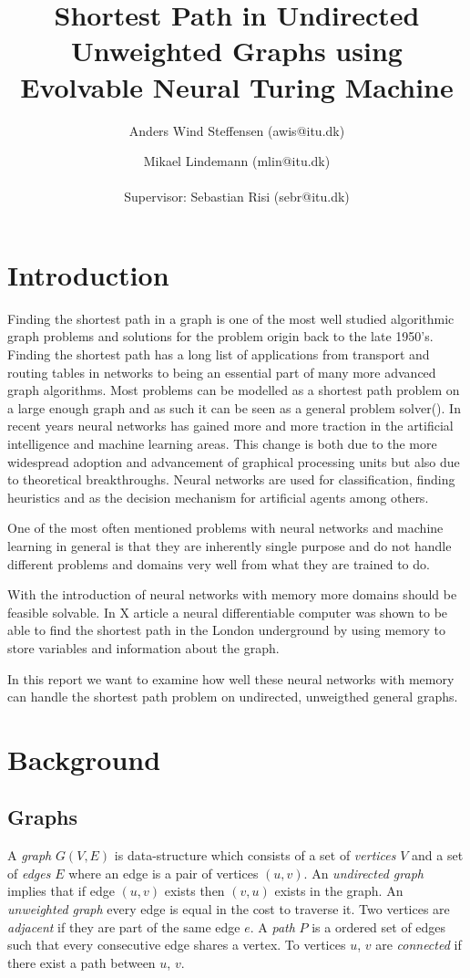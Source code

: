 \documentclass{article}
\author{Anders Wind Steffensen (awis@itu.dk)\and Mikael Lindemann (mlin@itu.dk)\\\\Supervisor: Sebastian Risi (sebr@itu.dk)}
\title{Shortest Path in Undirected Unweighted Graphs using Evolvable Neural Turing Machine}
\begin{document}
\maketitle
\tableofcontents
\newpage
\section{Introduction}
Finding the shortest path in a graph is one of the most well studied algorithmic graph problems and solutions for the problem origin back to the late 1950's. Finding the shortest path has a long list of applications from transport and routing tables in networks to being an essential part of many more advanced graph algorithms. Most problems can be modelled as a shortest path problem on a large enough graph and as such it can be seen as a general problem solver(). In recent years neural networks has gained more and more traction in the artificial intelligence and machine learning areas. This change is both due to the more widespread adoption and advancement of graphical processing units but also due to theoretical breakthroughs. Neural networks are used for classification, finding heuristics and as the decision mechanism for artificial agents among others.

One of the most often mentioned problems with neural networks and machine learning in general is that they are inherently single purpose and do not handle different problems and domains very well from what they are trained to do.

With the introduction of neural networks with memory more domains should be feasible solvable. In X article a neural differentiable computer was shown to be able to find the shortest path in the London underground by using memory to store variables and information about the graph.

In this report we want to examine how well these neural networks with memory can handle the shortest path problem on undirected, unweigthed general graphs. 

\section{Background}
\subsection{Graphs}
A \textit{graph} $G(V,E)$ is data-structure which consists of a set of \textit{vertices} $V$ and a set of \textit{edges} $E$ where an edge is a pair of vertices $(u,v)$. An \textit{undirected graph} implies that if edge $ (u,v) $ exists then $ (v,u) $ exists in the graph. An \textit{unweighted graph} every edge is equal in the cost to traverse it. 
Two vertices are \textit{adjacent} if they are part of the same edge $ e $. A \textit{path} $ P $ is a ordered set of edges such that every consecutive edge shares a vertex. To vertices $ u $, $ v $ are \textit{connected} if there exist a path between $ u $, $ v $.
\end{document}
